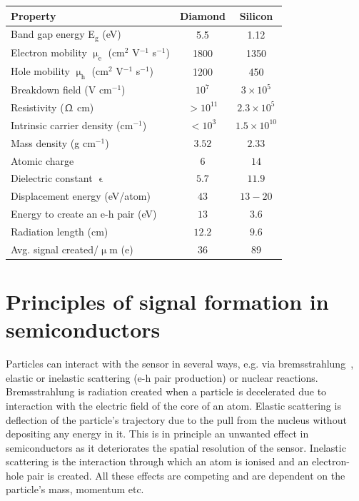 \begin{footnotesize}
\begin{center}
\begin{tabular}{   l  c  c   }
\hline
Property & Diamond & Silicon \\
\hline
Band gap energy E$_\mathrm{g}$ (eV) & 5.5 & 1.12  \\
Electron mobility $\upmu_\mathrm{e}$ (cm$^2$ V$^{-1}$ s$^{-1}$) & 1800 & 1350 \\
Hole mobility $\upmu_\mathrm{h}$ (cm$^2$ V$^{-1}$ s$^{-1}$) & 1200 & 450 \\
Breakdown field (V cm$^{-1}$) & $10^{7}$ & $3\times 10^5$ \\
Resistivity ($\Upomega$ cm) & $>10^{11}$  & $2.3\times 10^5$  \\
Intrinsic carrier density (cm$^{-1}$) & $<10^3$ & $1.5\times 10^{10} $ \\
Mass density (g cm$^{-1}$) & $ 3.52$ & $2.33 $ \\
Atomic charge  & $6 $ & $ 14$ \\
Dielectric constant $\upvarepsilon$ & $5.7 $ & $11.9 $ \\
Displacement energy (eV/atom) & $43 $ & $13-20 $ \\
Energy to create an e-h pair  (eV) & $13 $ & $ 3.6$ \\
Radiation length (cm) & $ 12.2$ & $9.6 $ \\
Avg. signal created/$\upmu$m (e) & 36 & 89 \\\hline
\end{tabular}
\label{tab:semicompare}
\end{center}
\end{footnotesize}


\section{Principles of signal formation in semiconductors}
\label{sec:princsigfor}
Particles can interact with the sensor in several ways, e.g. via bremsstrahlung~\cite{}, elastic or inelastic scattering (e-h pair production) or nuclear reactions. Bremsstrahlung is radiation created when a particle is decelerated due to interaction with the electric field of the core of an atom. Elastic scattering is deflection of the particle's trajectory due to the pull from the nucleus without depositing any energy in it. This is in principle an unwanted effect in semiconductors as it deteriorates the spatial resolution of the sensor. Inelastic scattering is the interaction through which an atom is ionised and an electron-hole pair is created. All these effects are competing and are dependent on the particle's mass, momentum etc. 

